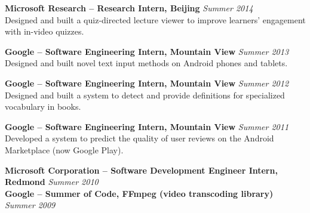 \documentclass[margin,line]{resume}
\begin{document}
\begin{resume}
\textbf{Microsoft Research -- Research Intern, Beijing} \hfill \textsl{Summer 2014}\\
Designed and built a quiz-directed lecture viewer to improve learners' engagement with in-video quizzes.

\textbf{Google -- Software Engineering Intern, Mountain View} \hfill \textsl{Summer 2013}\\
Designed and built novel text input methods on Android phones and tablets.

\textbf{Google -- Software Engineering Intern, Mountain View} \hfill \textsl{Summer 2012}\\
Designed and built a system to detect and provide definitions for specialized vocabulary in books. %

\textbf{Google -- Software Engineering Intern, Mountain View} \hfill \textsl{Summer 2011}\\
Developed a system to predict the quality of user reviews on the Android Marketplace (now Google Play). %

\textbf{Microsoft Corporation -- Software Development Engineer Intern, Redmond} \hfill \textsl{Summer 2010}\\
\textbf{Google -- Summer of Code, FFmpeg (video transcoding library)} \hfill \textsl{Summer 2009}\\



\end{resume}
\end{document}
